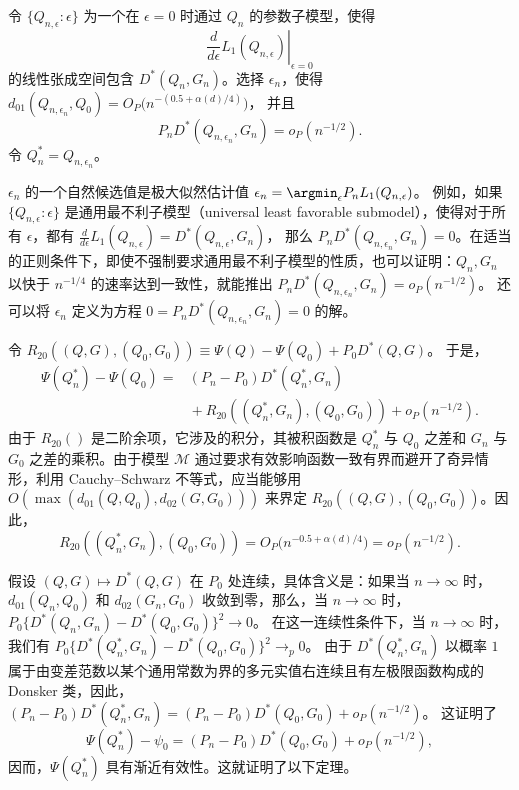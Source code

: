 令 $\{Q_{n,\epsilon}:\epsilon\}$ 为一个在 $\epsilon=0$ 时通过 $Q_n$ 的参数子模型，使得
\[
 \left.\frac{d}{d\epsilon}L_1(Q_{n,\epsilon})\right|_{\epsilon=0}
\]
的线性张成空间包含 $D^*(Q_n,G_n)$。选择 $\epsilon_n$，使得
$d_{01}(Q_{n,\epsilon_n},Q_0)
 =O_P\bigl(n^{-(0.5+\alpha(d)/4)}\bigr)$，
并且
\[
 P_nD^*(Q_{n,\epsilon_n},G_n)=o_P(n^{-1/2}).
\]
令 $Q_n^*=Q_{n,\epsilon_n}$。

$\epsilon_n$ 的一个自然候选值是极大似然估计值
$\epsilon_n=\argmin_\epsilon P_nL_1(Q_{n,\epsilon})$。
例如，如果 $\{Q_{n,\epsilon}:\epsilon\}$ 是通用最不利子模型（universal least favorable submodel），使得对于所有 $\epsilon$，都有
$\frac{d}{d\epsilon}L_1(Q_{n,\epsilon})
 =D^*(Q_{n,\epsilon},G_n)$，
那么 $P_nD^*(Q_{n,\epsilon_n},G_n)=0$。在适当的正则条件下，即使不强制要求通用最不利子模型的性质，也可以证明：$Q_n,G_n$ 以快于 $n^{-1/4}$ 的速率达到一致性，就能推出
$P_nD^*(Q_{n,\epsilon_n},G_n)=o_P(n^{-1/2})$。
还可以将 $\epsilon_n$ 定义为方程
$0=P_nD^*(Q_{n,\epsilon_n},G_n)=0$ 的解。

令
$R_{20}((Q,G),(Q_0,G_0))
 \equiv\Psi(Q)-\Psi(Q_0)+P_0D^*(Q,G)$。
于是，
\[
 \begin{aligned}
 \Psi(Q_n^*)-\Psi(Q_0)
  ={}&(P_n-P_0)D^*(Q_n^*,G_n)\\
    &{}+R_{20}((Q_n^*,G_n),(Q_0,G_0))+o_P(n^{-1/2}).
 \end{aligned}
\]
由于 $R_{20}()$ 是二阶余项，它涉及的积分，其被积函数是 $Q_n^*$ 与 $Q_0$ 之差和 $G_n$ 与 $G_0$ 之差的乘积。由于模型 $\mathcal M$ 通过要求有效影响函数一致有界而避开了奇异情形，利用 Cauchy--Schwarz 不等式，应当能够用
$O(\max(d_{01}(Q,Q_0),d_{02}(G,G_0)))$
来界定 $R_{20}((Q,G),(Q_0,G_0))$。因此，
\[
 R_{20}((Q_n^*,G_n),(Q_0,G_0))
 =O_P\bigl(n^{-0.5+\alpha(d)/4}\bigr)=o_P(n^{-1/2}).
\]

假设 $(Q,G)\mapsto D^*(Q,G)$ 在 $P_0$ 处连续，具体含义是：如果当 $n\to\infty$ 时，$d_{01}(Q_n,Q_0)$ 和 $d_{02}(G_n,G_0)$ 收敛到零，那么，当 $n\to\infty$ 时，
$P_0\{D^*(Q_n,G_n)-D^*(Q_0,G_0)\}^2\to0$。
在这一连续性条件下，当 $n\to\infty$ 时，我们有
$P_0\{D^*(Q_n^*,G_n)-D^*(Q_0,G_0)\}^2\to_p0$。
由于 $D^*(Q_n^*,G_n)$ 以概率 $1$ 属于由变差范数以某个通用常数为界的多元实值右连续且有左极限函数构成的 Donsker 类，因此，
$(P_n-P_0)D^*(Q_n^*,G_n)
 =(P_n-P_0)D^*(Q_0,G_0)+o_P(n^{-1/2})$。
这证明了
\[
 \Psi(Q_n^*)-\psi_0
 =(P_n-P_0)D^*(Q_0,G_0)+o_P(n^{-1/2}),
\]
因而，$\Psi(Q_n^*)$ 具有渐近有效性。这就证明了以下定理。

